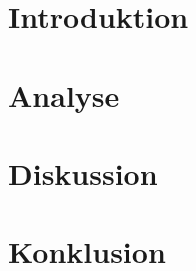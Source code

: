 
\usepackage[disable]{todonotes}					%
\usepackage[draft]{fixme}


	
	\clearpage
	\newpage\null\thispagestyle{empty}
	
	\addtocounter{page}{4}
	
	\newpage\null\thispagestyle{empty}\newpage
	\label{startoftoc}
	\begin{KeepFromToc}
		\tableofcontents
		\newpage\null\thispagestyle{empty}\newpage
		\todototoc
		\listoftodos
	\end{KeepFromToc}
	\label{endoftoc}
	
	\chapter{Introduktion}
	\chapter{Analyse}
	
	
	
	
	\chapter{Diskussion}
	\chapter{Konklusion}
	
	
	
	\label{lastpagewithoutappendix}

	\appendix
	\cleardoublepage

